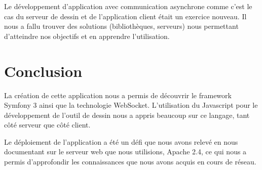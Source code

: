 \documentclass[a4paper]{article}
\begin{document}
Le développement d'application avec communication asynchrone comme c'est le cas du serveur de dessin et de l'application client était un exercice nouveau. Il nous a fallu trouver des solutions (bibliothèques, serveurs) nous permettant d'atteindre nos objectifs et en apprendre l'utilisation.

\section{Conclusion}
La création de cette application nous a permis de découvrir le framework Symfony 3 ainsi que la technologie \cite{WebSockets}WebSocket. L'utilisation du Javascript pour le développement de l'outil de dessin nous a appris beaucoup sur ce langage, tant côté serveur que côté client.

Le déploiement de l'application a été un défi que nous avons relevé en nous documentant sur le serveur web que nous utilisions, Apache 2.4, ce qui nous a permis d'approfondir les connaissances que nous avons acquis en cours de réseau.
\newpage


\end{document}
